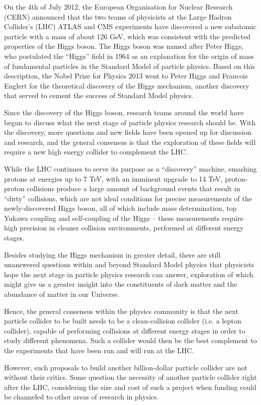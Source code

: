 On the 4th of July 2012, the European Organisation for Nuclear Research (CERN) announced that the two teams of physicists at the Large Hadron Collider's (LHC) ATLAS and CMS experiments have discovered a new subatomic particle with a mass of about 126 GeV, which was consistent with the predicted properties of the Higgs boson. The Higgs boson was named after Peter Higgs, who postulated the ``Higgs'' field in 1964 as an explanation for the origin of mass of fundamental particles in the Standard Model of particle physics. Based on this description, the Nobel Prize for Physics 2013 went to Peter Higgs and Francois Englert for the theoretical discovery of the Higgs mechanism, another discovery that served to cement the success of Standard Model physics.
 
Since the discovery of the Higgs boson, research teams around the world have begun to discuss what the next stage of particle physics research should be. With the discovery, more questions and new fields have been opened up for discussion and research, and the general consensus is that the exploration of these fields will require a new high energy collider to complement the LHC.
 
While the LHC continues to serve its purpose as a “discovery” machine, smashing protons at energies up to 7 TeV, with an imminent upgrade to 14 TeV, proton-proton collisions produce a large amount of background events that result in “dirty” collisions, which are not ideal conditions for precise measurements of the newly-discovered Higgs boson, all of which include mass determination, top Yukawa coupling and self-coupling of the Higgs – these measurements require high precision in cleaner collision environments, performed at different energy stages.
 
Besides studying the Higgs mechanism in greater detail, there are still unanswered questions within and beyond Standard Model physics that physicists hope the next stage in particle physics research can answer, exploration of which might give us a greater insight into the constituents of dark matter and the abundance of matter in our Universe.
 
Hence, the general consensus within the physics community is that the next particle collider to be built needs to be a clean-collision collider (i.e. a lepton collider), capable of performing collisions at different energy stages in order to study different phenomena. Such a collider would then be the best complement to the experiments that have been run and will run at the LHC.
 
However, such proposals to build another billion-dollar particle collider are not without their critics. Some question the necessity of another particle collider right after the LHC, considering the size and cost of such a project when funding could be channeled to other areas of research in physics.